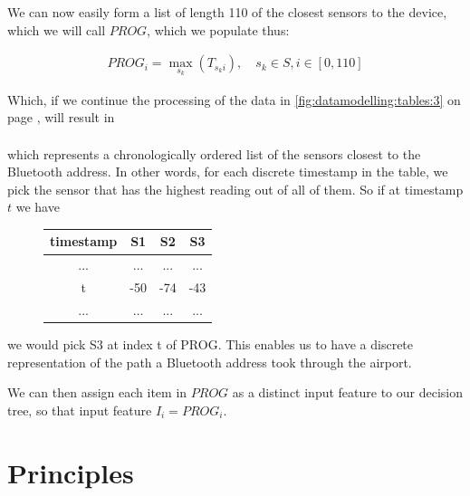 \par
We can now easily form a list of length 110 of the closest sensors to the device, which we will call $PROG$, which we populate thus:

\begin{align*}
    PROG_i = \max_{s_k} (T_{s_ki}),\quad s_k \in S, i \in [0, 110]
\end{align*}

Which, if we continue the processing of the data in \cref{fig:datamodelling:tables:3} on page  \pageref{fig:datamodelling:tables}, will result in
\begin{align*}
    [S1, S1, S1, S1, S1, S1, S1, S2, S2, S3, S3]
\end{align*}

which represents a chronologically ordered list of the sensors closest to the Bluetooth address. In other words, for each discrete timestamp in the table, we pick the sensor that has the highest reading out of all of them. So if at timestamp $t$ we have

\begin{figure}[H]
    \centering
    \begin{tabular}{ |c||c|c|c| }
         \hline
         timestamp & S1 & S2 & S3 \\
         \hline
         ...  & ... & ... & ... \\ 
         t & -50 & -74 & -43 \\ 
         ... & ... & ... & ... \\ 
         \hline
    \end{tabular}
    \label{fig:dectrees:selectingexample}
\end{figure}

we would pick S3 at index t of PROG. This enables us to have a discrete representation of the path a Bluetooth address took through the airport.\\

\par
We can then assign each item in $PROG$ as a distinct input feature to our decision tree, so that input feature $I_i = PROG_i$.

\section{Principles}

